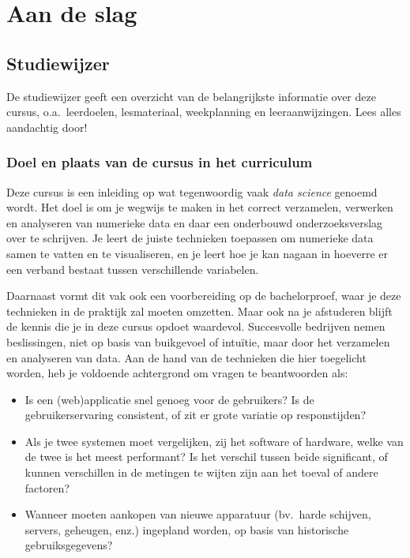 \chapter{Aan de slag}
\label{ch:aan-de-slag}

\section{Studiewijzer}

De studiewijzer geeft een overzicht van de belangrijkste informatie over deze cursus, o.a.~leerdoelen, lesmateriaal, weekplanning en leeraanwijzingen. Lees alles aandachtig door!

\subsection{Doel en plaats van de cursus in het curriculum}

Deze cursus is een inleiding op wat tegenwoordig vaak \emph{data science} genoemd wordt. Het doel is om je wegwijs te maken in het correct verzamelen, verwerken en analyseren van numerieke data en daar een onderbouwd onderzoeksverslag over te schrijven. Je leert de juiste technieken toepassen om numerieke data samen te vatten en te visualiseren, en je leert hoe je kan nagaan in hoeverre er een verband bestaat tussen verschillende variabelen.

Daarnaast vormt dit vak ook een voorbereiding op de bachelorproef, waar je deze technieken in de praktijk zal moeten omzetten. Maar ook na je afstuderen blijft de kennis die je in deze cursus opdoet waardevol. Succesvolle bedrijven nemen beslissingen, niet op basis van buikgevoel of intuïtie, maar door het verzamelen en analyseren van data. Aan de hand van de technieken die hier toegelicht worden, heb je voldoende achtergrond om vragen te beantwoorden als:

\begin{itemize}
  \item Is een (web)applicatie snel genoeg voor de gebruikers? Is de gebruikerservaring consistent, of zit er grote variatie op responstijden?
  \item Als je twee systemen moet vergelijken, zij het software of hardware, welke van de twee is het meest performant? Is het verschil tussen beide significant, of kunnen verschillen in de metingen te wijten zijn aan het toeval of andere factoren?
  \item Wanneer moeten aankopen van nieuwe apparatuur (bv.~harde schijven, servers, geheugen, enz.) ingepland worden, op basis van historische gebruiksgegevens?
\end{itemize}

